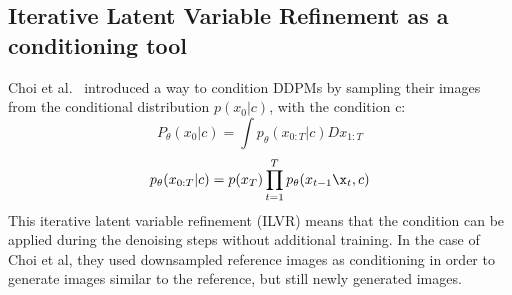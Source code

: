 \documentclass[journal=jacsat,manuscript=article]{achemso}
\begin{document}
\subsection{Iterative Latent Variable Refinement as a conditioning tool}
Choi et al.~\cite{choi2021ilvr} introduced a way to condition DDPMs by sampling their images from the conditional distribution $p(x_0|c)$, with the condition c:
\begin{equation}
    P_\theta(x_0|c) = \int p_\theta(x_{0:T}|c)Dx_{1:T}
\end{equation}
\begin{equation}
    p_{\theta}(x_{0:T}|c)=p(x_T)\prod_{t=1}^{T}p_{\theta}(x_{t-1}\x_t,c)
\end{equation}
This iterative latent variable refinement (ILVR) means that the condition can be applied during the denoising steps without additional training. In the case of Choi et al, they used downsampled reference images as conditioning in order to generate images similar to the reference, but still newly generated images. 

\end{document}
